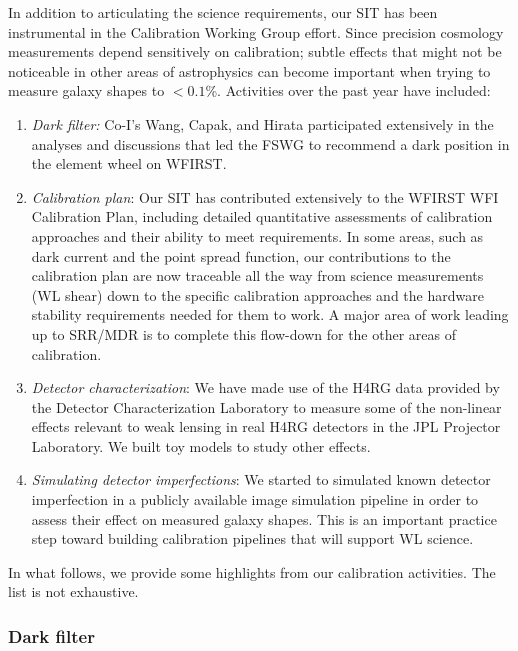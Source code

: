 \begin{summaryii}
  In addition to articulating the science requirements, our SIT has been
  instrumental in the Calibration Working Group effort. Since precision
  cosmology measurements depend sensitively on calibration; subtle effects that
  might not be noticeable in other areas of astrophysics can become important
  when trying to measure galaxy shapes to $<0.1$\%. Activities over the past
  year have included:
  \begin{enumerate}
  \item {\em Dark filter:} Co-I's Wang, Capak, and Hirata participated
  extensively in the analyses and discussions that led the FSWG to recommend a
  dark position in the element wheel on WFIRST.
 \item {\em Calibration plan}: Our SIT has contributed extensively to the WFIRST WFI
Calibration Plan, including detailed quantitative assessments of calibration
approaches and their ability to meet requirements. In some areas, such as dark
current and the point spread function, our contributions to the calibration plan
are now traceable all the way from science measurements (WL shear) down to the
specific calibration approaches and the hardware stability requirements needed
for them to work. A major area of work leading up to SRR/MDR is to complete this
flow-down for the other areas of calibration.
\item {\em Detector characterization}: We have made use of the H4RG data provided by the Detector Characterization Laboratory to measure some of the non-linear effects relevant
to weak lensing in real H4RG detectors in the JPL Projector Laboratory. We built toy models to study other effects.
\item {\em Simulating detector imperfections}: We started to simulated known detector imperfection in a publicly available image simulation pipeline in order to assess their effect on measured galaxy shapes. This is an important practice step
toward building calibration pipelines that will support WL science.
\end{enumerate}
In what follows, we provide some highlights from our calibration activities. The
list is not exhaustive.
\end{summaryii}

\subsubsection{Dark filter}

